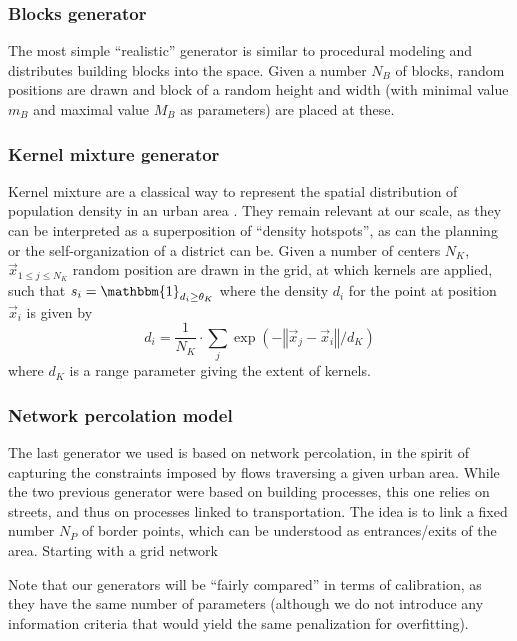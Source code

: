 \documentclass[letterpaper]{article}
\newcommand{\norm}[1]{\left\Vert #1\right\Vert}
\begin{document}



\subsubsection{Blocks generator}

The most simple ``realistic'' generator is similar to procedural modeling and distributes building blocks into the space. Given a number $N_B$ of blocks, random positions are drawn and block of a random height and width (with minimal value $m_B$ and maximal value $M_B$ as parameters) are placed at these.


\subsubsection{Kernel mixture generator}

Kernel mixture are a classical way to represent the spatial distribution of population density in an urban area \citep{anas1998urban}. They remain relevant at our scale, as they can be interpreted as a superposition of ``density hotspots'', as can the planning or the self-organization of a district can be. Given a number of centers $N_K$, $\vec{x}_{1\leq j \leq N_K}$ random position are drawn in the grid, at which kernels are applied, such that $s_i = \mathbbm{1}_{d_i \geq \theta_K}$ where the density $d_i$ for the point at position $\vec{x}_i$ is given by
\begin{equation}
    d_i = \frac{1}{N_K}\cdot \sum_j \exp{\left(-\norm{\vec{x}_j - \vec{x}_i}/d_K\right)} 
\end{equation}
where $d_K$ is a range parameter giving the extent of kernels.

\subsubsection{Network percolation model}

The last generator we used is based on network percolation, in the spirit of capturing the constraints imposed by flows traversing a given urban area. While the two previous generator were based on building processes, this one relies on streets, and thus on processes linked to transportation. The idea is to link a fixed number $N_P$ of border points, which can be understood as entrances/exits of the area. Starting with a grid network 


Note that our generators will be ``fairly compared'' in terms of calibration, as they have the same number of parameters (although we do not introduce any information criteria that would yield the same penalization for overfitting).
\end{document}
